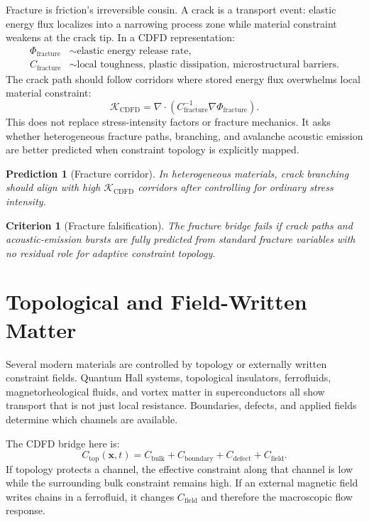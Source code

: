 \documentclass[11pt]{article}
\newtheorem{prediction}{Prediction}
\newtheorem{criterion}{Criterion}
\begin{document}
Fracture is friction's irreversible cousin. A crack is a transport event: elastic energy flux localizes into a narrowing process zone while material constraint weakens at the crack tip. In a CDFD representation:
\begin{align}
    \Phi_{\mathrm{fracture}} &\sim \text{elastic energy release rate},\\
    C_{\mathrm{fracture}} &\sim \text{local toughness, plastic dissipation, microstructural barriers}.
\end{align}
The crack path should follow corridors where stored energy flux overwhelms local material constraint:
\begin{equation}
    \mathcal{K}_{\mathrm{CDFD}}
    =
    \nabla\cdot\left(C_{\mathrm{fracture}}^{-1}\nabla \Phi_{\mathrm{fracture}}\right).
\end{equation}
This does not replace stress-intensity factors or fracture mechanics. It asks whether heterogeneous fracture paths, branching, and avalanche acoustic emission are better predicted when constraint topology is explicitly mapped.

\begin{prediction}[Fracture corridor]
In heterogeneous materials, crack branching should align with high $\mathcal{K}_{\mathrm{CDFD}}$ corridors after controlling for ordinary stress intensity.
\end{prediction}

\begin{criterion}[Fracture falsification]
The fracture bridge fails if crack paths and acoustic-emission bursts are fully predicted from standard fracture variables with no residual role for adaptive constraint topology.
\end{criterion}

\section{Topological and Field-Written Matter}

Several modern materials are controlled by topology or externally written constraint fields. Quantum Hall systems, topological insulators, ferrofluids, magnetorheological fluids, and vortex matter in superconductors all show transport that is not just local resistance. Boundaries, defects, and applied fields determine which channels are available.

The CDFD bridge here is:
\begin{equation}
    C_{\mathrm{top}}(\mathbf{x},t)
    =
    C_{\mathrm{bulk}}+
    C_{\mathrm{boundary}}+
    C_{\mathrm{defect}}+
    C_{\mathrm{field}}.
\end{equation}
If topology protects a channel, the effective constraint along that channel is low while the surrounding bulk constraint remains high. If an external magnetic field writes chains in a ferrofluid, it changes $C_{\mathrm{field}}$ and therefore the macroscopic flow response.
\end{document}
